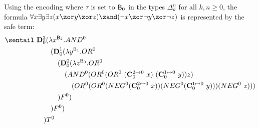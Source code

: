 %
\begin{example}
Using the encoding where $\tau$ is set to  $\mathsf{B}_0$ in the types $\Delta_k^n$ for all $k,n\geq 0$, the formula $\forall x \exists y \exists z (x\zor y\zor z)\zand(\neg x\zor \neg y\zor \neg z)$ is represented by the safe term:
\begin{align*}
\sentail~&\mathbf{D}_0^2(\lambda x^{\booltype_2}. AND^0\\
&\quad\quad (\mathbf{D}_0^1(\lambda y^{\booltype_1}.OR^0\\
&\quad\quad\quad (\mathbf{D}_0^0(\lambda z^{\booltype_0}.OR^0\\
&\quad\quad\quad\quad (AND^0 (OR^0(OR^0~(\mathbf{C}_0^{2\mapsto 0}~x)~(\mathbf{C}_0^{1\mapsto 0}~y))z) \\
&\quad\quad\quad\quad\quad (OR^0(OR^0(NEG^0 (\mathbf{C}_0^{2\mapsto 0}~x))(NEG^0 (\mathbf{C}_0^{1\mapsto 0}~y)))(NEG^0~z))) \\
&\quad\quad\quad )F^0)\\
&\quad\quad)F^0)\\
&\quad) T^0
\end{align*}
\end{example}

